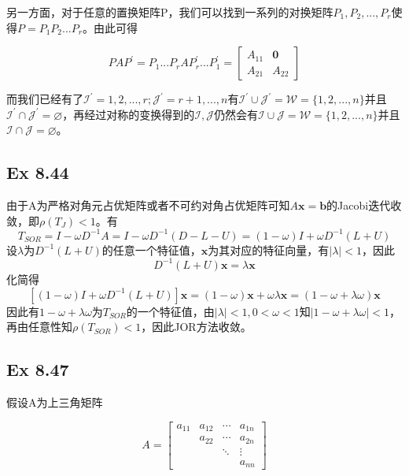 \documentclass{article}
\begin{document}
\indent 另一方面，对于任意的置换矩阵P，我们可以找到一系列的对换矩阵$P_{1},P_{2},...,P_{r}$使得$P=P_{1}P_{2}...P_{r}$。由此可得

\begin{equation*}
PAP^{'}=P_{1}...P_{r}AP^{'}_{r}...P^{'}_{1}={
\left [ \begin{array}{cc}
A_{11} & \textbf{0} \\
A_{21} & A_{22}
\end{array}\right ]}
\end{equation*}

而我们已经有了$\mathscr{I}^{'}={1,2,...,r};\mathscr{J}^{'}={r+1,...,n}$有$\mathscr{I}^{'}\cup\mathscr{J}^{'}=\mathscr{W}=\{1,2,...,n\}$并且$\mathscr{I}^{'}\cap\mathscr{J}^{'}=\varnothing$，再经过对称的变换得到的$\mathscr{I},\mathscr{J}$仍然会有$\mathscr{I}\cup\mathscr{J}=\mathscr{W}=\{1,2,...,n\}$并且$\mathscr{I}\cap\mathscr{J}=\varnothing$。

\subsection*{Ex 8.44}
\indent 由于A为严格对角元占优矩阵或者不可约对角占优矩阵可知$A\textbf{x}=\textbf{b}$的Jacobi迭代收敛，即$\rho(T_{J})<1$。有
$$
T_{SOR}=I-\omega D^{-1}A = I -\omega D^{-1}(D-L-U) = (1-\omega)I+\omega D^{-1}(L+U)
$$
设$\lambda$为$D^{-1}(L+U)$的任意一个特征值，$\textbf{x}$为其对应的特征向量，有$\vert \lambda \vert < 1$，因此
$$
D^{-1}(L+U)\textbf{x} = \lambda \textbf{x}
$$
化简得
$$
[(1-\omega)I+\omega D^{-1}(L+U)]\textbf{x} = (1-\omega)\textbf{x}+\omega\lambda\textbf{x}=(1-\omega+\lambda\omega)\textbf{x}
$$
因此有$1-\omega+\lambda\omega$为$T_{SOR}$的一个特征值，由$\vert \lambda \vert < 1,0<\omega<1$知$\vert 1-\omega+\lambda\omega\vert<1$，再由任意性知$\rho(T_{SOR})<1$，因此JOR方法收敛。

\subsection*{Ex 8.47}
\indent 假设A为上三角矩阵

\begin{equation*}
	A=\left[
	\begin{array}{cccc}	
	a_{11} & a_{12} & \cdots & a_{1n} \\	
	&a_{22} & \cdots &a_{2n} \\	
	& & \ddots & \vdots \\	
	&
	& &a_{nn}	
	\end{array}\right]
\end{equation*}
\end{document}
